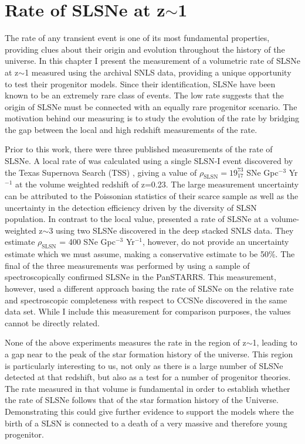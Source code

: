 \chapter{Rate of SLSNe at z$\sim$1}
\label{Chapter3}

The rate of any transient event is one of its most fundamental properties, providing clues about their origin and evolution throughout the history of the universe. In this chapter I present the measurement of a volumetric rate of SLSNe at z$\sim$1 measured using the archival SNLS data, providing a unique opportunity to test their progenitor models. Since their identification, SLSNe have been known to be an extremely rare class of events. The low rate suggests that the origin of SLSNe must be connected with an equally rare progenitor scenario. The motivation behind our measuring is to study the evolution of the rate by bridging the gap between the local and high redshift measurements of the rate.

Prior to this work, there were three published measurements of the rate of SLSNe. A local rate of was calculated using a single SLSN-I event discovered by the Texas Supernova Search (TSS) \citep{Quimby2014}, giving a value of $\rho_{\mathrm{SLSN}} = 19^{73}_{17}$ SNe Gpc$^{-3}$ Yr$^{-1}$ at the volume weighted redshift of z=0.23. The large measurement uncertainty can be attributed to the Poissonian statistics of their scarce sample as well as the uncertainty in the detection efficiency driven by the diversity of SLSN population. In contrast to the local value, \citet{Cookie2012} presented a rate of SLSNe at a volume-weighted z$\sim$3 using two SLSNe discovered in the deep stacked SNLS data. They estimate $\rho_{\mathrm{SLSN}}$ = 400 SNe Gpc$^{-3}$ Yr$^{-1}$, however, do not provide an uncertainty estimate which we must assume, making a conservative estimate to be 50\%. The final of the three measurements was performed by \citet{McCrum2014} using a sample of spectroscopically confirmed SLSNe in the PanSTARRS. This measurement, however, used a different approach basing the rate of SLSNe on the relative rate and spectroscopic completeness with respect to CCSNe discovered in the same data set. While I include this measurement for comparison purposes, the values cannot be directly related.

None of the above experiments measures the rate in the region of z$\sim$1, leading to a gap near to the peak of the star formation history of the universe. This region is particularly interesting to us, not only as there is a large number of SLSNe detected at that redshift, but also as a test for a number of progenitor theories. The rate measured in that volume is fundamental in order to establish whether the rate of SLSNe follows that of the star formation history of the Universe. Demonstrating this could give further evidence to support the models where the birth of a SLSN is connected to a death of a very massive and therefore young progenitor.


